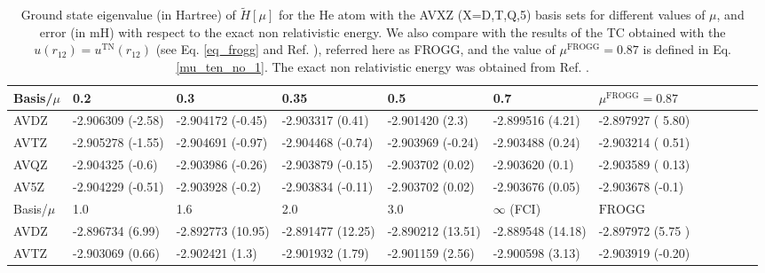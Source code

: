 \documentclass[aip,jcp,reprint,noshowkeys,superscriptaddress,twocolumn]{revtex4-1}
\newcommand{\frogg}[0]{\text{FROGG}}
\newcommand{\mfrogg}[0]{\mu^\text{FROGG}}
\begin{document}
\begin{table}
\caption{Ground state eigenvalue (in Hartree) of $\tilde{H}[\mu]$ for the He atom with the AVXZ (X=D,T,Q,5) basis sets for different values of $\mu$, and error (in mH) with respect to the exact non relativistic energy. 
We also compare with the results of the TC obtained with the $u(r_{12}) = u^{\text{TN}}(r_{12})$ (see Eq. \eqref{eq_frogg} and Ref. ), referred here as FROGG, and the value of $\mfrogg=0.87$ is defined in Eq. \eqref{mu_ten_no_1}. The exact non relativistic energy was obtained from Ref. \cite{Dav-ions-PRA-91}. 
 }
\begin{ruledtabular}
\begin{tabular}{llllllllllll}
 Basis/$\mu$ & 0.2                   & 0.3                   & 0.35                  & 0.5                  & 0.7                 & $\mfrogg=0.87$    \\
\hline                                                                                                                                                  
 AVDZ        &    -2.906309 (-2.58)  &    -2.904172 (-0.45)  &    -2.903317 (0.41)   &    -2.901420 (2.3)   &    -2.899516 (4.21) &  -2.897927 ( 5.80)    \\
 AVTZ        &    -2.905278 (-1.55)  &    -2.904691 (-0.97)  &    -2.904468 (-0.74)  &    -2.903969 (-0.24) &    -2.903488 (0.24) &  -2.903214 ( 0.51)    \\
 AVQZ        &    -2.904325 (-0.6)   &    -2.903986 (-0.26)  &    -2.903879 (-0.15)  &    -2.903702 (0.02)  &    -2.903620 (0.1)  &  -2.903589 ( 0.13)     \\
 AV5Z        &    -2.904229 (-0.51)  &    -2.903928 (-0.2)   &    -2.903834 (-0.11)  &    -2.903702 (0.02)  &    -2.903676 (0.05) &  -2.903678 (-0.1)     \\
\hline
 Basis/$\mu$ & 1.0                   & 1.6                   & 2.0                   & 3.0                  & $\infty$ (FCI)       &     $\frogg$        \\
\hline                                                                                                                                                   
 AVDZ        &    -2.896734 (6.99)   &    -2.892773 (10.95)  &    -2.891477 (12.25)  &    -2.890212 (13.51) &    -2.889548 (14.18) &    -2.897972 (5.75 )\\
 AVTZ        &    -2.903069 (0.66)   &    -2.902421 (1.3)    &    -2.901932 (1.79)   &    -2.901159 (2.56)  &    -2.900598 (3.13)  &    -2.903919 (-0.20)\\

\end{tabular}
\end{ruledtabular}
\end{table}
\end{document}
